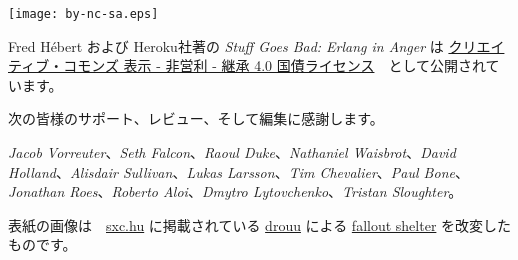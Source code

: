 \clearpage
\thispagestyle{fancy}

\fancyhf{} %
\renewcommand{\headrulewidth}{0pt} %
\renewcommand{\footrulewidth}{0pt}

\vspace*{\fill}


\begin{center}
\texttt{[image: by-nc-sa.eps]}
\end{center}

\begin{center}
Fred Hébert および Heroku社著の \emph{Stuff Goes Bad: Erlang in Anger} は \href{http://creativecommons.org/licenses/by-nc-sa/4.0/}{クリエイティブ・コモンズ 表示 - 非営利 - 継承 4.0 国債ライセンス}　として公開されています。
\end{center}

次の皆様のサポート、レビュー、そして編集に感謝します。

\emph{Jacob Vorreuter}、\emph{Seth Falcon}、\emph{Raoul Duke}、\emph{Nathaniel Waisbrot}、\emph{David Holland}、\emph{Alisdair Sullivan}、\emph{Lukas Larsson}、\emph{Tim Chevalier}、\emph{Paul Bone}、\emph{Jonathan Roes}、\emph{Roberto Aloi}、\emph{Dmytro Lytovchenko}、\emph{Tristan Sloughter}。

\null
\vfill
表紙の画像は　\href{http://sxc.hu}{sxc.hu} に掲載されている \href{http://www.freeimages.com/profile/drouu}{drouu} による \href{http://www.freeimages.com/photo/533163}{fallout shelter} を改変したものです。


